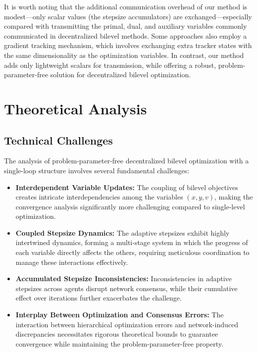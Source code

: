 \documentclass{article}
\theoremstyle{plain}
\theoremstyle{definition}
\theoremstyle{remark}
\begin{document}
It is worth noting that the additional communication overhead of our method is modest—only scalar values (the stepsize accumulators) are exchanged—especially compared with transmitting the primal, dual, and auxiliary variables commonly communicated in decentralized bilevel methods. Some approaches \citep{gao2023convergence, chen2023decentralized, zhu2024sparkle} also employ a gradient tracking mechanism, which involves exchanging extra tracker states with the same dimensionality as the optimization variables. In contrast, our method adds only lightweight scalars for transmission, while offering a robust, problem-parameter-free solution for decentralized bilevel optimization.

\vspace{-0.1cm}
\section{Theoretical Analysis}
\vspace{-0.1cm}
\subsection{Technical Challenges}
\vspace{-0.1cm}

The analysis of problem-parameter-free decentralized bilevel optimization with a single-loop structure involves several fundamental challenges:
\begin{itemize}[topsep=0pt, itemsep=2pt, parsep=0pt, leftmargin=0.25cm]
    \item \textbf{Interdependent Variable Updates:} The coupling of bilevel objectives creates intricate interdependencies among the variables \((x, y, v)\), making the convergence analysis significantly more challenging compared to single-level optimization.
    \item \textbf{Coupled Stepsize Dynamics:} The adaptive stepsizes exhibit highly intertwined dynamics, forming a multi-stage system in which the progress of each variable directly affects the others, requiring meticulous coordination to manage these interactions effectively.
    \item \textbf{Accumulated Stepsize Inconsistencies:} Inconsistencies in adaptive stepsizes across agents disrupt network consensus, while their cumulative effect over iterations further exacerbates the challenge.
    \item \textbf{Interplay Between Optimization and Consensus Errors:} The interaction between hierarchical optimization errors and network-induced discrepancies necessitates rigorous theoretical bounds to guarantee convergence while maintaining the problem-parameter-free property.
\end{itemize}
\end{document}
